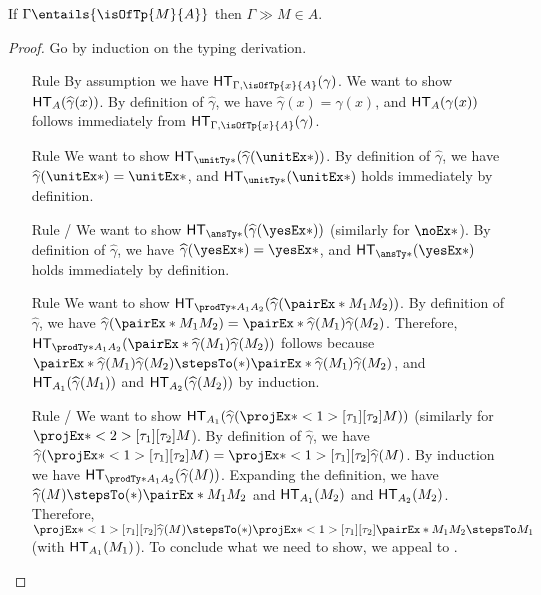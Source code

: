 \documentclass[letterpaper]{article}
\begin{document}
\begin{theorem}\label{thm:fundamental}
If $\Gamma \entails{\isOfTp{M}{A}}$ then $\Gamma \gg M \in A$.
\end{theorem}
\begin{proof}
Go by induction on the typing derivation.
\begin{enumerate}
  \item [Rule \ruleref{sta:var}] By assumption we have $\HT[\Gamma, \isOfTp{x}{A}](\gamma)$. We want to show $\HT[A](\widehat{\gamma}(x))$. By definition of $\widehat{\gamma}$, we have $\widehat{\gamma}(x) = \gamma(x)$, and $\HT[A](\gamma(x))$ follows immediately from $\HT[\Gamma, \isOfTp{x}{A}](\gamma)$.
  \item [Rule \ruleref{sta:triv}] We want to show $\HT[\unitTy*](\widehat{\gamma}(\unitEx*))$. By definition of $\widehat{\gamma}$, we have $\widehat{\gamma}(\unitEx*) = \unitEx*$, and $\HT[\unitTy*](\unitEx*)$ holds immediately by definition.
  \item [Rule \ruleref{sta:ans1}/\ruleref{sta:ans2}] We want to show $\HT[\ansTy*](\widehat{\gamma}(\yesEx*))$ (similarly for $\noEx*$). By definition of $\widehat{\gamma}$, we have $\widehat{\gamma}(\yesEx*) = \yesEx*$, and $\HT[\ansTy*](\yesEx*)$ holds immediately by definition.
  \item [Rule \ruleref{sta:pair}] We want to show $\HT[\prodTy*{A_1}{A_2}](\widehat{\gamma}(\pairEx*{M_1}{M_2}))$. By definition of $\widehat{\gamma}$, we have $\widehat{\gamma}(\pairEx*{M_1}{M_2}) = \pairEx*{\widehat{\gamma}(M_1)}{\widehat{\gamma}(M_2)}$. Therefore, $\HT[\prodTy*{A_1}{A_2}](\pairEx*{\widehat{\gamma}(M_1)}{\widehat{\gamma}(M_2)})$ follows because $\pairEx*{\widehat{\gamma}(M_1)}{\widehat{\gamma}(M_2)} \stepsTo(*) \pairEx*{\widehat{\gamma}(M_1)}{\widehat{\gamma}(M_2)}$, and $\HT[A_1](\widehat{\gamma}(M_1))$ and $\HT[A_2](\widehat{\gamma}(M_2))$ by induction.
  \item [Rule \ruleref{sta:prl}/\ruleref{sta:prr}] We want to show $\HT[A_1](\widehat{\gamma}(\fstEx*{M}))$ (similarly for $\sndEx*{M}$). By definition of $\widehat{\gamma}$, we have $\widehat{\gamma}(\fstEx*{M}) = \fstEx*{\widehat{\gamma}(M)}$. By induction we have $\HT[\prodTy*{A_1}{A_2}](\widehat{\gamma}(M))$. Expanding the definition, we have $\widehat{\gamma}(M) \stepsTo(*) \pairEx*{M_1}{M_2}$ and $\HT[A_1](M_2)$ and $\HT[A_2](M_2)$. Therefore, $\fstEx*{\widehat{\gamma}(M)} \stepsTo(*) \fstEx*{\pairEx*{M_1}{M_2}} \stepsTo M_1$ (with $\HT[A_1](M_1)$). To conclude what we need to show, we appeal to .

\end{enumerate}
\end{proof}
\end{document}
